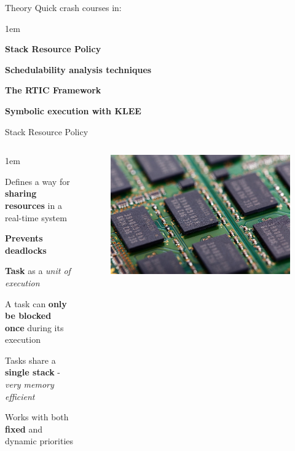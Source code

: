 \begin{frame}{Theory}
    Quick crash courses in:
    \vspace{1em}
    \begin{itemize-size}{1em}
        \item \textbf{Stack Resource Policy}
        \item \textbf{Schedulability analysis techniques}
        \item \textbf{The RTIC Framework}
        \item \textbf{Symbolic execution with KLEE}
    \end{itemize-size}
\end{frame}

\begin{frame}{Stack Resource Policy}
    \begin{columns}
        \begin{itemize-size}{1em}
            \item Defines a way for \textbf{sharing resources} in a real-time system
            \item \textbf{Prevents deadlocks}
            \item \textbf{Task} as a \emph{unit of execution}
            \item A task can \textbf{only be blocked once} during its execution
            \item Tasks share a \textbf{single stack} - \emph{very memory efficient}
            \item Works with both \textbf{fixed} and dynamic priorities
        \end{itemize-size}

        \begin{figure}
            \centering
            \includegraphics[scale=0.15]{pictures/ram.jpg}
        \end{figure}
    \end{columns}
\end{frame}


